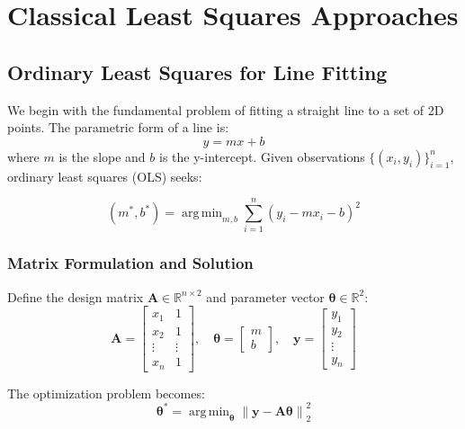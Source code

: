 \documentclass[12pt]{article}
\DeclareMathOperator{\argmin}{arg\,min}
\renewcommand{\vec}[1]{\mathbf{#1}}
\newcommand{\norm}[1]{\left\lVert #1 \right\rVert}
\newcommand{\R}{\mathbb{R}}
\theoremstyle{definition}
\begin{document}
\newpage
\section{Classical Least Squares Approaches}

\subsection{Ordinary Least Squares for Line Fitting}

We begin with the fundamental problem of fitting a straight line to a set of 2D points. The parametric form of a line is:
\begin{equation}
    y = mx + b
\end{equation}
where $m$ is the slope and $b$ is the y-intercept. Given observations $\{(x_i, y_i)\}_{i=1}^n$, ordinary least squares (OLS) seeks:

\begin{equation}
    (m^*, b^*) = \argmin_{m,b} \sum_{i=1}^n (y_i - mx_i - b)^2
\end{equation}

\subsubsection{Matrix Formulation and Solution}

Define the design matrix $\vec{A} \in \R^{n \times 2}$ and parameter vector $\vec{\theta} \in \R^2$:
\begin{equation}
    \vec{A} = \begin{bmatrix}
        x_1    & 1      \\
        x_2    & 1      \\
        \vdots & \vdots \\
        x_n    & 1
    \end{bmatrix}, \quad
    \vec{\theta} = \begin{bmatrix}
        m \\ b
    \end{bmatrix}, \quad
    \vec{y} = \begin{bmatrix}
        y_1 \\ y_2 \\ \vdots \\ y_n
    \end{bmatrix}
\end{equation}

The optimization problem becomes:
\begin{equation}
    \vec{\theta}^* = \argmin_{\vec{\theta}} \norm{\vec{y} - \vec{A}\vec{\theta}}_2^2
\end{equation}
\end{document}
